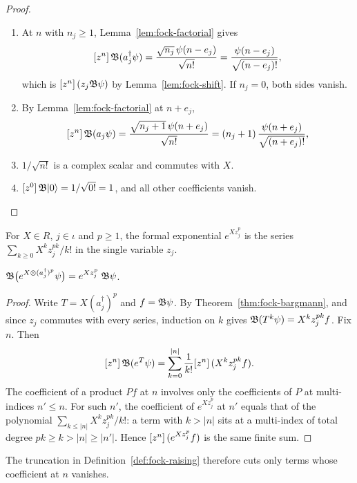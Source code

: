 \begin{proof}
\begin{enumerate}
\item[(a)] At $n$ with $n_j\ge1$, Lemma~\ref{lem:fock-factorial} gives
\[
 [z^{n}]\,\mathfrak B(a_j^\dagger\psi)=\frac{\sqrt{n_j}\,\psi(n-e_j)}{\sqrt{n!}}
 =\frac{\psi(n-e_j)}{\sqrt{(n-e_j)!}},
\]
which is $[z^{n}]\,(z_j\mathfrak B\psi)$ by Lemma~\ref{lem:fock-shift}. If $n_j=0$, both sides
vanish.
\item[(b)] By Lemma~\ref{lem:fock-factorial} at $n+e_j$,
\[
 [z^{n}]\,\mathfrak B(a_j\psi)=\frac{\sqrt{n_j+1}\,\psi(n+e_j)}{\sqrt{n!}}
 =(n_j+1)\,\frac{\psi(n+e_j)}{\sqrt{(n+e_j)!}},
\]
\item[(c)] $1/\sqrt{n!}$ is a complex scalar and commutes with $X$.
\item[(d)] $[z^{0}]\,\mathfrak B\lvert 0\rangle=1/\sqrt{0!}=1$, and all other coefficients vanish.\qedhere
\end{enumerate}
\end{proof}

For $X\in R$, $j\in\iota$ and $p\ge1$, the formal exponential $e^{Xz_j^p}$ is the series
$\sum_{k\ge0}X^kz_j^{pk}/k!$ in the single variable $z_j$.

\begin{theorem}\label{thm:fock-exp-bargmann}
$\mathfrak B\bigl(e^{X\otimes(a_j^\dagger)^p}\psi\bigr)=e^{Xz_j^p}\;\mathfrak B\psi$.
\end{theorem}

\begin{proof}
Write $T=X(a_j^\dagger)^p$ and $f=\mathfrak B\psi$. By Theorem~\ref{thm:fock-bargmann}, and since
$z_j$ commutes with every series, induction on $k$ gives $\mathfrak B(T^k\psi)=X^kz_j^{pk}f$.
Fix $n$. Then
\[
 [z^{n}]\,\mathfrak B(e^T\psi)=\sum_{k=0}^{\lvert n\rvert}\frac1{k!}[z^{n}]\,(X^kz_j^{pk}f).
\]
The coefficient of a product $Pf$ at $n$ involves only the coefficients of $P$ at
multi-indices $n'\le n$. For such $n'$, the coefficient of $e^{Xz_j^p}$ at $n'$ equals that of
the polynomial $\sum_{k\le\lvert n\rvert}X^kz_j^{pk}/k!$: a term with $k>\lvert n\rvert$
sits at a multi-index of total degree $pk\ge k>\lvert n\rvert\ge\lvert n'\rvert$. Hence
$[z^{n}]\,(e^{Xz_j^p}f)$ is the same finite sum.
\end{proof}

The truncation in Definition~\ref{def:fock-raising} therefore cuts only terms whose
coefficient at $n$ vanishes.

